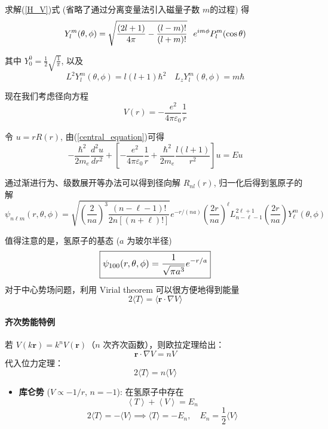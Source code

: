 求解(\ref{H_V})式 (省略了通过分离变量法引入磁量子数 \(m\)的过程) 得
\[Y_l^m(\theta ,\phi ) = \sqrt {\frac{{(2l + 1)}}{{4\pi }} - \frac{{(l - m)!}}{{(l + m)!}}} \;\;{\mkern 1mu} {\kern 1pt} {e^{im\phi }}P_l^m(\cos \theta )\]

其中 $\displaystyle Y_0^0 = \frac{1}{2}\sqrt {\frac{1}{\pi }} $, 以及
\[{L^2}Y_l^m(\theta ,\phi ) = l(l + 1){\hbar ^2} \quad {L_z}Y_l^m(\theta ,\phi ) = m\hbar \]

现在我们考虑径向方程
\[ V(r) = -\frac{e^{2}}{4\pi\varepsilon_{0}} \frac{1}{r} \] 

令 $\displaystyle u = rR(r)$, 由(\ref{central_equation})可得
\[
-\frac{\hbar^{2}}{2m_e} \frac{d^{2}u}{dr^{2}} + \left[ -\frac{e^{2}}{4\pi\varepsilon_{0}} \frac{1}{r} + \frac{\hbar^{2}}{2m_e} \frac{l(l+1)}{r^{2}} \right] u = Eu
\]

通过渐进行为、级数展开等办法可以得到径向解 $\displaystyle {R_{nl}}\left( r \right)$, 归一化后得到氢原子的解
\[\boxed{
	\psi_{n\ell m}(r,\theta,\phi) = 
	\sqrt{ \left( \frac{2}{n a} \right)^3 \frac{(n-\ell-1)!}{2n[(n+\ell)!]} } 
	e^{-r/(n a)} 
	\left( \frac{2r}{n a} \right)^{\ell}
	L_{n-\ell-1}^{2\ell+1}\!\left( \frac{2r}{n a} \right)
	Y_{\ell}^{m}(\theta, \phi)
}
\]

值得注意的是，氢原子的基态 (\(a\) 为玻尔半径)
\[
\scalebox{1.1}{
	$\displaystyle
	\boxed{\psi_{100}(r, \theta, \phi) = \frac{1}{\sqrt{\pi a^3}} e^{-r / a}}$
}
\]
对于中心势场问题，利用 Virial theorem 可以很方便地得到能量
\begin{equation*}\boxed{
		2\langle T \rangle = \langle \mathbf{r} \cdot \nabla V \rangle
	}
\end{equation*}
\paragraph{齐次势能特例}
若 $V(k \mathbf{r}) = k^n V(\mathbf{r})$（$n$ 次齐次函数），则欧拉定理给出：
\[
\mathbf{r} \cdot \nabla V = n V
\]
代入位力定理：
\begin{equation*}
	\boxed{2\langle T \rangle = n \langle V \rangle}
\end{equation*}

\begin{itemize}
	\item \textbf{库仑势} ($V \propto -1/r$, $n = -1$):
	在氢原子中存在\[\left\langle T \right\rangle  + \left\langle V \right\rangle  = {E_n}\]
	\[
	2\langle T \rangle = -\langle V \rangle \implies \langle T \rangle = -E_n, \quad  E_n= \frac{1}{2}\langle V \rangle
	\]
\end{itemize}

